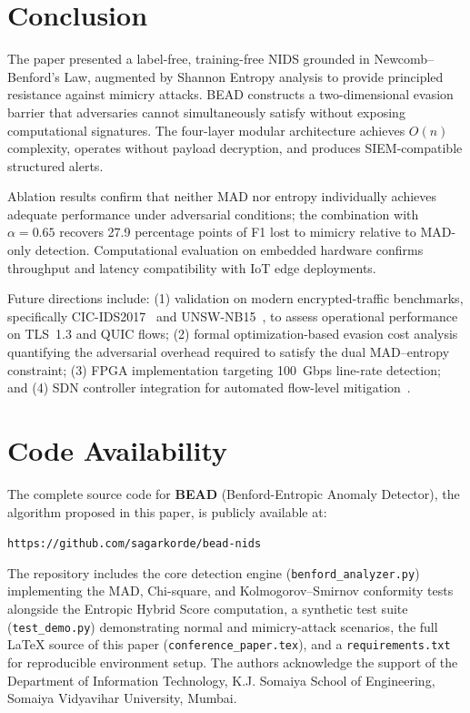\documentclass[conference]{IEEEtran}
\begin{document}
\section{Conclusion}

The paper presented a label-free, training-free NIDS grounded in
Newcomb--Benford's Law, augmented by Shannon Entropy analysis to provide
principled resistance against mimicry attacks. BEAD constructs a two-dimensional evasion barrier that adversaries cannot
simultaneously satisfy without exposing computational signatures. The
four-layer modular architecture achieves \(O(n)\) complexity, operates
without payload decryption, and produces SIEM-compatible structured alerts.

Ablation results confirm that neither MAD nor entropy individually achieves
adequate performance under adversarial conditions; the combination with
$\alpha=0.65$ recovers 27.9 percentage points of F1 lost to mimicry relative
to MAD-only detection. Computational evaluation on embedded hardware confirms
throughput and latency compatibility with IoT edge deployments.

Future directions include: (1) validation on modern encrypted-traffic
benchmarks, specifically CIC-IDS2017~\cite{b19} and UNSW-NB15~\cite{b20},
to assess operational performance on TLS~1.3 and QUIC flows; (2) formal
optimization-based evasion cost analysis quantifying the adversarial overhead
required to satisfy the dual MAD--entropy constraint; (3) FPGA implementation
targeting 100~Gbps line-rate detection; and (4) SDN controller integration
for automated flow-level mitigation~\cite{b22}.

\section*{Code Availability}

The complete source code for \textbf{BEAD} (Benford-Entropic Anomaly
Detector), the algorithm proposed in this paper, is publicly available
at:

\begin{center}
\texttt{https://github.com/sagarkorde/bead-nids}
\end{center}

The repository includes the core detection engine
(\texttt{benford\_analyzer.py}) implementing the MAD, Chi-square, and
Kolmogorov--Smirnov conformity tests alongside the Entropic Hybrid
Score computation, a synthetic test suite
(\texttt{test\_demo.py}) demonstrating normal and mimicry-attack
scenarios, the full \LaTeX{} source of this paper
(\texttt{conference\_paper.tex}), and a \texttt{requirements.txt}
for reproducible environment setup.
The authors acknowledge the support of the Department of Information
Technology, K.J. Somaiya School of Engineering, Somaiya Vidyavihar
University, Mumbai.
\end{document}
